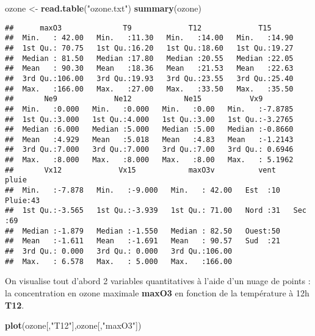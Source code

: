 \documentclass[]{book}
\newenvironment{Shaded}{\begin{snugshade}}{\end{snugshade}}
\newcommand{\KeywordTok}[1]{\textcolor[rgb]{0.13,0.29,0.53}{\textbf{#1}}}
\newcommand{\NormalTok}[1]{#1}
\newcommand{\StringTok}[1]{\textcolor[rgb]{0.31,0.60,0.02}{#1}}
\theoremstyle{definition}
\theoremstyle{definition}
\theoremstyle{definition}
\theoremstyle{remark}
\begin{document}
\begin{Shaded}
\begin{Highlighting}[]
\NormalTok{ozone <-}\StringTok{ }\KeywordTok{read.table}\NormalTok{(}\StringTok{"ozone.txt"}\NormalTok{)}
\KeywordTok{summary}\NormalTok{(ozone)}
\end{Highlighting}
\end{Shaded}

\begin{verbatim}
##      maxO3              T9             T12             T15       
##  Min.   : 42.00   Min.   :11.30   Min.   :14.00   Min.   :14.90  
##  1st Qu.: 70.75   1st Qu.:16.20   1st Qu.:18.60   1st Qu.:19.27  
##  Median : 81.50   Median :17.80   Median :20.55   Median :22.05  
##  Mean   : 90.30   Mean   :18.36   Mean   :21.53   Mean   :22.63  
##  3rd Qu.:106.00   3rd Qu.:19.93   3rd Qu.:23.55   3rd Qu.:25.40  
##  Max.   :166.00   Max.   :27.00   Max.   :33.50   Max.   :35.50  
##       Ne9             Ne12            Ne15           Vx9         
##  Min.   :0.000   Min.   :0.000   Min.   :0.00   Min.   :-7.8785  
##  1st Qu.:3.000   1st Qu.:4.000   1st Qu.:3.00   1st Qu.:-3.2765  
##  Median :6.000   Median :5.000   Median :5.00   Median :-0.8660  
##  Mean   :4.929   Mean   :5.018   Mean   :4.83   Mean   :-1.2143  
##  3rd Qu.:7.000   3rd Qu.:7.000   3rd Qu.:7.00   3rd Qu.: 0.6946  
##  Max.   :8.000   Max.   :8.000   Max.   :8.00   Max.   : 5.1962  
##       Vx12             Vx15            maxO3v          vent      pluie   
##  Min.   :-7.878   Min.   :-9.000   Min.   : 42.00   Est  :10   Pluie:43  
##  1st Qu.:-3.565   1st Qu.:-3.939   1st Qu.: 71.00   Nord :31   Sec  :69  
##  Median :-1.879   Median :-1.550   Median : 82.50   Ouest:50             
##  Mean   :-1.611   Mean   :-1.691   Mean   : 90.57   Sud  :21             
##  3rd Qu.: 0.000   3rd Qu.: 0.000   3rd Qu.:106.00                        
##  Max.   : 6.578   Max.   : 5.000   Max.   :166.00
\end{verbatim}

On visualise tout d'abord 2 variables quantitatives à l'aide d'un nuage de points : la concentration en ozone maximale \textbf{maxO3} en fonction de la température à 12h \textbf{T12}.

\begin{Shaded}
\begin{Highlighting}[]
\KeywordTok{plot}\NormalTok{(ozone[,}\StringTok{"T12"}\NormalTok{],ozone[,}\StringTok{"maxO3"}\NormalTok{])}
\end{Highlighting}
\end{Shaded}
\end{document}
